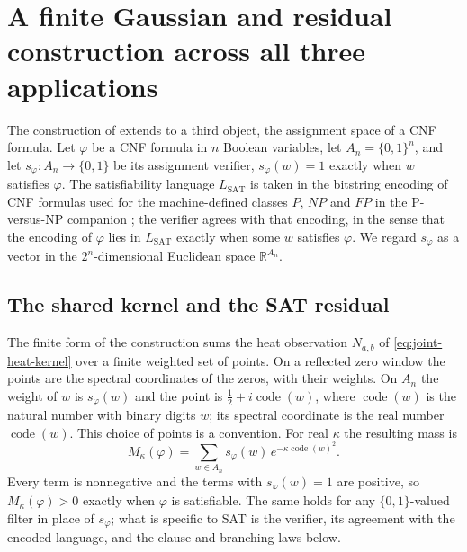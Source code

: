 \section{A finite Gaussian and residual construction across all three applications}
\label{sec:triad-bridge}

The construction of  extends to a third
object, the assignment space of a CNF formula.  Let \(\varphi\) be a CNF
formula in \(n\) Boolean variables, let \(A_{n}=\{0,1\}^{n}\), and let
\(s_{\varphi}:A_{n}\to\{0,1\}\) be its assignment verifier,
\(s_{\varphi}(w)=1\) exactly when \(w\) satisfies \(\varphi\).  The
satisfiability language \(L_{\mathrm{SAT}}\) is taken in the bitstring
encoding of CNF formulas used for the machine-defined classes \(P\),
\(NP\) and \(FP\) in the P-versus-NP companion \cite{Tsiokos2026PvNP};
the verifier agrees with that encoding, in the sense that the encoding
of \(\varphi\) lies in \(L_{\mathrm{SAT}}\) exactly when some \(w\)
satisfies \(\varphi\).  We regard \(s_{\varphi}\) as a vector in the
\(2^{n}\)-dimensional Euclidean space \(\mathbb R^{A_{n}}\).

\subsection{The shared kernel and the SAT residual}

The finite form of the construction sums the heat observation
\(N_{a,b}\) of \eqref{eq:joint-heat-kernel} over a finite weighted set
of points.  On a reflected zero window the points are the spectral
coordinates of the zeros, with their weights.  On \(A_{n}\) the weight
of \(w\) is \(s_{\varphi}(w)\) and the point is
\(\frac12+i\operatorname{code}(w)\), where \(\operatorname{code}(w)\)
is the natural number with binary digits \(w\); its spectral coordinate
is the real number \(\operatorname{code}(w)\).  This choice of points is
a convention.  For real \(\kappa\) the resulting mass is
\begin{equation}
\label{eq:triad-sat-mass}
 M_\kappa(\varphi)=\sum_{w\in A_n}s_\varphi(w)\,
       e^{-\kappa\operatorname{code}(w)^2}.
\end{equation}
Every term is nonnegative and the terms with \(s_{\varphi}(w)=1\) are
positive, so \(M_{\kappa}(\varphi)>0\) exactly when \(\varphi\) is
satisfiable.  The same holds for any \(\{0,1\}\)-valued filter in place
of \(s_{\varphi}\); what is specific to SAT is the verifier, its
agreement with the encoded language, and the clause and branching laws
below.

